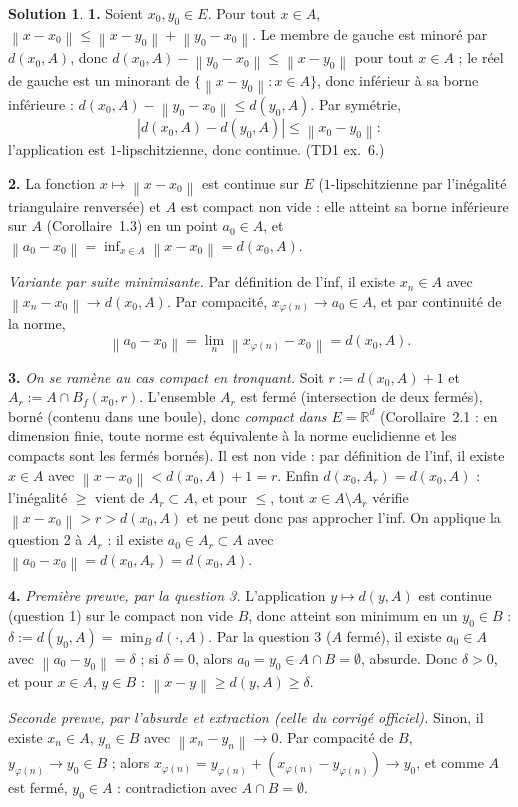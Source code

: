 \documentclass[11pt,a4paper]{article}
\newcommand{\R}{\mathbb{R}}
\newcommand{\Bf}{B_f}
\newcommand{\norm}[1]{\left\|#1\right\|}
\theoremstyle{definition}
\newtheorem*{solution}{Solution}
\begin{document}
\begin{solution}
\noindent\textbf{1.} Soient $x_0,y_0\in E$. Pour tout $x\in A$, $\norm{x-x_0}\le\norm{x-y_0}+\norm{y_0-x_0}$. Le membre de gauche est minoré par $d(x_0,A)$, donc $d(x_0,A)-\norm{y_0-x_0}\le\norm{x-y_0}$ pour tout $x\in A$ ; le réel de gauche est un minorant de $\{\norm{x-y_0}:x\in A\}$, donc inférieur à sa borne inférieure : $d(x_0,A)-\norm{y_0-x_0}\le d(y_0,A)$. Par symétrie,
\[
|d(x_0,A)-d(y_0,A)|\le\norm{x_0-y_0} :
\]
l'application est $1$-lipschitzienne, donc continue. (TD1 ex.~6.)

\medskip
\noindent\textbf{2.} La fonction $x\mapsto\norm{x-x_0}$ est continue sur $E$ ($1$-lipschitzienne par l'inégalité triangulaire renversée) et $A$ est compact non vide : elle atteint sa borne inférieure sur $A$ (Corollaire~1.3) en un point $a_0\in A$, et $\norm{a_0-x_0}=\inf_{x\in A}\norm{x-x_0}=d(x_0,A)$.

\emph{Variante par suite minimisante.} Par définition de l'inf, il existe $x_n\in A$ avec $\norm{x_n-x_0}\to d(x_0,A)$. Par compacité, $x_{\varphi(n)}\to a_0\in A$, et par continuité de la norme,
\[
\norm{a_0-x_0}=\lim_n\norm{x_{\varphi(n)}-x_0}=d(x_0,A).
\]

\medskip
\noindent\textbf{3.} \emph{On se ramène au cas compact en tronquant.} Soit $r:=d(x_0,A)+1$ et $A_r:=A\cap\Bf(x_0,r)$. L'ensemble $A_r$ est fermé (intersection de deux fermés), borné (contenu dans une boule), donc \emph{compact dans $E=\R^d$} (Corollaire~2.1 : en dimension finie, toute norme est équivalente à la norme euclidienne et les compacts sont les fermés bornés). Il est non vide : par définition de l'inf, il existe $x\in A$ avec $\norm{x-x_0}<d(x_0,A)+1=r$. Enfin $d(x_0,A_r)=d(x_0,A)$ : l'inégalité $\ge$ vient de $A_r\subset A$, et pour $\le$, tout $x\in A\setminus A_r$ vérifie $\norm{x-x_0}>r>d(x_0,A)$ et ne peut donc pas approcher l'inf. On applique la question 2 à $A_r$ : il existe $a_0\in A_r\subset A$ avec $\norm{a_0-x_0}=d(x_0,A_r)=d(x_0,A)$.

\medskip
\noindent\textbf{4.} \emph{Première preuve, par la question 3.} L'application $y\mapsto d(y,A)$ est continue (question 1) sur le compact non vide $B$, donc atteint son minimum en un $y_0\in B$ : $\delta:=d(y_0,A)=\min_Bd(\cdot,A)$. Par la question 3 ($A$ fermé), il existe $a_0\in A$ avec $\norm{a_0-y_0}=\delta$ ; si $\delta=0$, alors $a_0=y_0\in A\cap B=\emptyset$, absurde. Donc $\delta>0$, et pour $x\in A$, $y\in B$ : $\norm{x-y}\ge d(y,A)\ge\delta$.

\emph{Seconde preuve, par l'absurde et extraction (celle du corrigé officiel).} Sinon, il existe $x_n\in A$, $y_n\in B$ avec $\norm{x_n-y_n}\to0$. Par compacité de $B$, $y_{\varphi(n)}\to y_0\in B$ ; alors $x_{\varphi(n)}=y_{\varphi(n)}+(x_{\varphi(n)}-y_{\varphi(n)})\to y_0$, et comme $A$ est fermé, $y_0\in A$ : contradiction avec $A\cap B=\emptyset$.
\end{solution}
\end{document}
